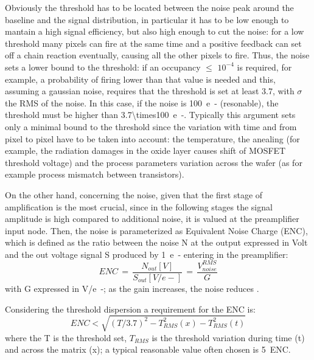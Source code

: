         Obviously the threshold has to be located between the noise peak around the baseline and the signal distribution, in particular it has to be low enough to mantain a high signal efficiency, but also high enough to cut the noise: for a low threshold many pixels can fire at the same time and a positive feedback can set off a chain reaction eventually, causing all the other pixels to fire.
        Thus, the noise sets a lower bound to the threshold: if an occupancy $\leqslant$ $10^{-4}$ is required, for example, a probability of firing lower than that value is needed and this, assuming a gaussian noise, requires that the threshold is set at least \SI{3.7}{\sigma}, with $\sigma$ the RMS of the noise.   
        In this case, if the noise is \SI{100}{e-} (resonable), the threshold must be higher than \SI[parse-numbers=false]{3.7\times100}{e-}.
        Typically this argument sets only a minimal bound to the threshold since the variation with time and from pixel to pixel have to be taken into account: the temperature, the anealing (for example, the radiation damages in the oxide layer causes shift of MOSFET threshold voltage) and the process parameters variation across the wafer (as for example process mismatch between transistors). 

        
        On the other hand, concerning the noise, given that the first stage of amplification is the most crucial, since in the following stages the signal amplitude is high compared to additional noise, it is valued at the preamplifier input node.
        Then, the noise is parameterized as Equivalent Noise Charge (ENC), which is defined as the ratio between the noise N at the output expressed in Volt and the out voltage signal S produced by \SI{1}{e-} entering in the preamplifier:
        \begin{equation}
            ENC\, =\, \frac{N_{out}[V]}{S_{out}[V/e-]}\,=\,\frac{V^{RMS} _{noise}}{G}
        \end{equation} 
        with G expressed in \si{V/e-}; as the gain increases, the noise reduces . 

        Considering the threshold dispersion a requirement for the ENC is: 
        \begin{equation}
            ENC < \sqrt{(T/3.7)^2 - T_{RMS} ^2 (x) - T_{RMS} ^2 (t)}
        \end{equation}
        where the T is the threshold set, $T_{RMS}$ is the threshold variation during time (t) and across the matrix (x); a typical reasonable value often chosen is \SI{5}{ENC}.

